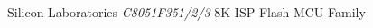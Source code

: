 \begin{thebibliography}{99}

 Silicon Laboratories \emph{C8051F351/2/3} 8K ISP Flash MCU Family

\end{thebibliography}




